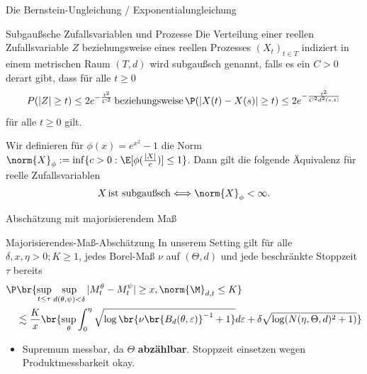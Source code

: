 \begin{frame}{Die Bernstein-Ungleichung / Exponentialungleichung}
    \begin{definitionblockname}{Subgaußsche Zufallsvariablen und Prozesse}
Die Verteilung einer reellen Zufallsvariable $Z$ beziehungsweise eines reellen Prozesses $(X_t)_{t\in T}$ indiziert in einem metrischen Raum $(T,d)$ wird subgaußsch genannt, falls es ein $C > 0$ derart gibt, dass für alle $t \geq 0$\[
P(|Z| \geq t) \leq 2e^{-\frac{t^2}{C^2}} \,\text{beziehungsweise} \, \P(|X(t)-X(s)| \geq t) \leq 2e^{-\frac{t^2}{C^2d^2(s,t)}}
\] für alle $t \geq 0$ gilt. 
\end{definitionblockname}
\begin{satzblock}
    Wir definieren für $\phi(x) = e^{x^2}-1$ die Norm $\norm{X}_\phi := \inf\{c > 0: \E[\phi(\frac{|X|}{c})] \leq 1\}$. 
    Dann gilt die folgende Äquivalenz für reelle Zufallsvariablen
\[
         X \,\text{ist subgaußsch} \Longleftrightarrow 
        \norm{X}_\phi < \infty.
 \]
\end{satzblock}
\end{frame}

\begin{frame}{Abschätzung mit majorisierendem Maß}
    \begin{lemmablockname}{Majorisierendes-Maß-Abschätzung}
        In unserem Setting gilt für alle $\delta, x, \eta > 0; K \geq 1$, jedes Borel-Maß $\nu$ auf $(\Theta, d)$ und jede beschränkte Stoppzeit $\tau$ bereits \begin{align*}
            \P&\br{\sup_{t \leq \tau} \sup_{d(\theta, \psi) < \delta} |M_t^\theta - M_t^\psi| \geq x, \norm{\M}_{d,t} \leq K} \\ &\lesssim\frac{K}{x} \br{\sup_\theta \int_0^\eta \sqrt{\log\br{\nu\br{B_d(\theta, \varepsilon)}^{-1} +1 }} d\varepsilon + \delta \sqrt{\log(N(\eta, \Theta, d)^2 +1)}}
        \end{align*}
    \end{lemmablockname}
    \begin{itemize}
        \item Supremum messbar, da $\Theta$ \textbf{abzählbar}. Stoppzeit einsetzen wegen Produktmessbarkeit okay.
    \end{itemize}
\end{frame}


